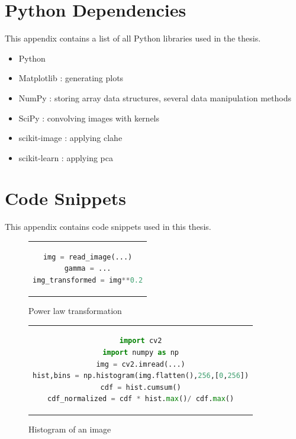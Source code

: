 \chapter{Python Dependencies}
\label{appendix:a}

This appendix contains a list of all Python libraries used in the thesis.

\begin{itemize}
    \item Python \cite{rossum2009python}
    \item Matplotlib \cite{hunter2007matplotlib}: generating plots
    \item NumPy \cite{harris2020array}: storing array data structures, several data manipulation methods
    \item SciPy \cite{2020SciPy-NMeth}: convolving images with kernels
	\item scikit-image \cite{scikit-image}: applying \gls{clahe}
	\item scikit-learn \cite{scikit-learn}: applying \gls{pca}
\end{itemize}

\chapter{Code Snippets}
\label{appendix:b}

\captionsetup{justification   = raggedright,
              singlelinecheck = false}

This appendix contains code snippets used in this thesis.

\begin{figure}[htpb]
	\begin{tabular}{c}
	\begin{lstlisting}[language=Python]
img = read_image(...)
gamma = ...
img_transformed = img**0.2
	\end{lstlisting}
	\end{tabular}
	\caption[Example listing]{Power law transformation}
\label{code:power-law}
\end{figure}

\begin{figure}[htpb]
	\begin{tabular}{c}
	\begin{lstlisting}[language=Python]
import cv2
import numpy as np
img = cv2.imread(...)
hist,bins = np.histogram(img.flatten(),256,[0,256])
cdf = hist.cumsum()
cdf_normalized = cdf * hist.max()/ cdf.max()
	\end{lstlisting}
	\end{tabular}
	\caption[Example listing]{Histogram of an image}
\label{code:histogram}
\end{figure}

